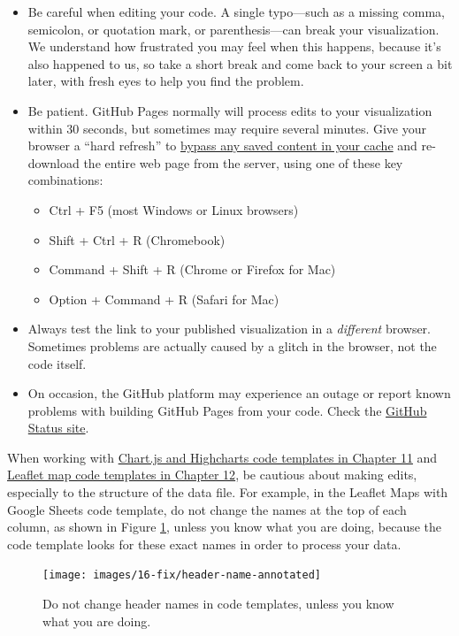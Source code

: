 \documentclass[
  english,
]{book}
\providecommand{\tightlist}{%
  \setlength{\itemsep}{0pt}\setlength{\parskip}{0pt}}
\begin{document}
\begin{itemize}
\item
  Be careful when editing your code. A single typo---such as a missing comma, semicolon, or quotation mark, or parenthesis---can break your visualization. We understand how frustrated you may feel when this happens, because it's also happened to us, so take a short break and come back to your screen a bit later, with fresh eyes to help you find the problem.
\item
  Be patient. GitHub Pages normally will process edits to your visualization within 30 seconds, but sometimes may require several minutes. Give your browser a ``hard refresh'' to \href{https://en.wikipedia.org/wiki/Wikipedia:Bypass_your_cache}{bypass any saved content in your cache} and re-download the entire web page from the server, using one of these key combinations:

  \begin{itemize}
  \tightlist
  \item
    Ctrl + F5 (most Windows or Linux browsers)
  \item
    Shift + Ctrl + R (Chromebook)
  \item
    Command + Shift + R (Chrome or Firefox for Mac)
  \item
    Option + Command + R (Safari for Mac)
  \end{itemize}
\item
  Always test the link to your published visualization in a \emph{different} browser. Sometimes problems are actually caused by a glitch in the browser, not the code itself.
\item
  On occasion, the GitHub platform may experience an outage or report known problems with building GitHub Pages from your code. Check the \href{https://status.github.com}{GitHub Status site}.
\end{itemize}

When working with \href{chartcode.html}{Chart.js and Highcharts code templates in Chapter 11} and \href{leaflet.html}{Leaflet map code templates in Chapter 12}, be cautious about making edits, especially to the structure of the data file. For example, in the Leaflet Maps with Google Sheets code template, do not change the names at the top of each column, as shown in Figure \ref{fig:header-name}, unless you know what you are doing, because the code template looks for these exact names in order to process your data.



\begin{figure}
\texttt{[image: images/16-fix/header-name-annotated]} \caption{Do not change header names in code templates, unless you know what you are doing.}\label{fig:header-name}
\end{figure}
\end{document}
